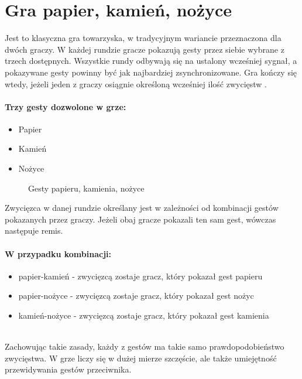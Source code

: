 \documentclass[a4paper,12pt,twoside,openany]{report}
\newcommand{\ImgPath}{.}
\begin{document}
\section{Gra papier, kamień, nożyce}
Jest to klasyczna gra towarzyska, w tradycyjnym wariancie przeznaczona dla dwóch graczy. W każdej rundzie gracze pokazują gesty przez siebie wybrane z trzech dostępnych. Wszystkie rundy odbywają się na ustalony wcześniej sygnał, a pokazywane gesty powinny być jak najbardziej zsynchronizowane. Gra kończy się wtedy, jeżeli jeden z graczy osiągnie określoną wcześniej ilość zwycięstw \cite{Fisher}.


\paragraph{Trzy gesty dozwolone w grze:}
\begin{itemize} 
	\item Papier
	\item Kamień
	\item Nożyce
\end{itemize} 

\begin{figure}[H]
	\centering
	\caption{Gesty papieru, kamienia, nożyce}
\end{figure}

Zwycięzca w danej rundzie określany jest w zależności od kombinacji gestów pokazanych przez graczy. Jeżeli obaj gracze pokazali ten sam gest, wówczas następuje remis. 

\paragraph{W przypadku kombinacji:}
\begin{itemize} 
	\item papier-kamień - zwycięzcą zostaje gracz, który pokazał gest papieru
	\item papier-nożyce - zwycięzcą zostaje gracz, który pokazał gest nożyc
	\item kamień-nożyce - zwycięzcą zostaje gracz, który pokazał gest kamienia
\end{itemize} 
\mbox{} \\	
Zachowując takie zasady, każdy z gestów ma takie samo prawdopodobieństwo zwycięstwa. W grze liczy się w dużej mierze szczęście, ale także umiejętność przewidywania gestów przeciwnika.
\end{document}
